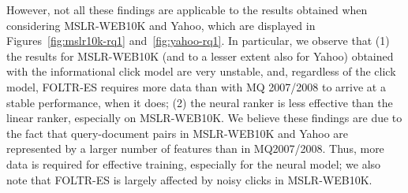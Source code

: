 However, not all these findings are applicable to the results obtained when considering MSLR-WEB10K and Yahoo, which are displayed in Figures~\ref{fig:mslr10k-rq1} and~\ref{fig:yahoo-rq1}. In particular, we observe that (1) the results for MSLR-WEB10K (and to a lesser extent also for Yahoo) obtained with the informational click model are very unstable, and, regardless of the click model, FOLTR-ES requires more data than with MQ 2007/2008 to arrive at a stable performance, when it does; (2) the neural ranker is less effective than the linear ranker, especially on MSLR-WEB10K. We believe these findings are due to the fact that query-document pairs in MSLR-WEB10K and Yahoo are represented by a larger number of features than in MQ2007/2008. Thus, more data is required for effective training, especially for the neural model; we also note that FOLTR-ES is largely affected by noisy clicks in MSLR-WEB10K. 






%

